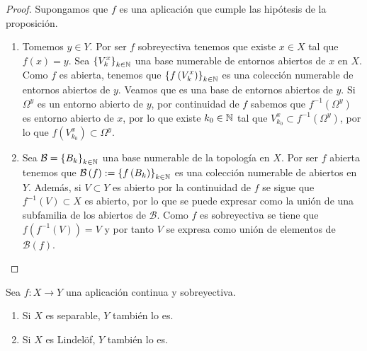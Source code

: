 \begin{proof}
	Supongamos que $\displaystyle f $ es una aplicación que cumple las hipótesis de la proposición. 
	\begin{enumerate}
	\item Tomemos $\displaystyle y \in Y $. Por ser $\displaystyle f $ sobreyectiva tenemos que existe $\displaystyle x \in X $ tal que $\displaystyle f\left(x\right)=y $. Sea $\displaystyle \left\{ V_{k}^{x}\right\} _{k \in \mathbb{N}} $ una base numerable de entornos abiertos de $\displaystyle x $ en $\displaystyle X $. Como $\displaystyle f $ es abierta, tenemos que $\displaystyle \left\{ f\left(V_{k}^{x}\right)\right\} _{k\in \mathbb{N}} $ es una colección numerable de entornos abiertos de $\displaystyle y $. Veamos que es una base de entornos abiertos de $\displaystyle y $. 
		Si $\displaystyle \Omega^{y} $ es un entorno abierto de $\displaystyle y $, por continuidad de $\displaystyle f $ sabemos que $\displaystyle f^{-1}\left(\Omega ^{y}\right) $ es entorno abierto de $\displaystyle x $, por lo que existe $\displaystyle k_{0} \in \mathbb{N} $ tal que $\displaystyle V^{x}_{k_{0}}\subset f^{-1}\left(\Omega ^{y}\right) $, por lo que $\displaystyle f\left(V^{x}_{k_{0}}\right)\subset \Omega^{y} $.
	\item Sea $\displaystyle \mathcal{B}= \left\{ B_{k}\right\} _{k \in \mathbb{N}} $ una base numerable de la topología en $\displaystyle X $. Por ser $\displaystyle f $ abierta tenemos que $\displaystyle \mathcal{B}\left(f\right):= \left\{ f\left(B_{k}\right)\right\} _{k \in \mathbb{N}} $ es una colección numerable de abiertos en $\displaystyle Y $. Además, si $\displaystyle V \subset Y $ es abierto por la continuidad de $\displaystyle f $ se sigue que $\displaystyle f^{-1}\left(V\right)\subset X $ es abierto, por lo que se puede expresar como la unión de una subfamilia de los abiertos de $\displaystyle \mathcal{B} $. 
		Como $\displaystyle f $ es sobreyectiva se tiene que $\displaystyle f\left(f^{-1}\left(V\right)\right)=V $ y por tanto $\displaystyle V $ se expresa como unión de elementos de $\displaystyle \mathcal{B}\left(f\right) $. 
	\end{enumerate}
\end{proof}
\begin{prop}
Sea $\displaystyle f : X \to Y $ una aplicación continua y sobreyectiva. 
\begin{enumerate}
\item Si $\displaystyle X $ es separable, $\displaystyle Y $ también lo es. 
\item Si $\displaystyle X $ es Lindelöf, $\displaystyle Y $ también lo es.
\end{enumerate}
\end{prop}
